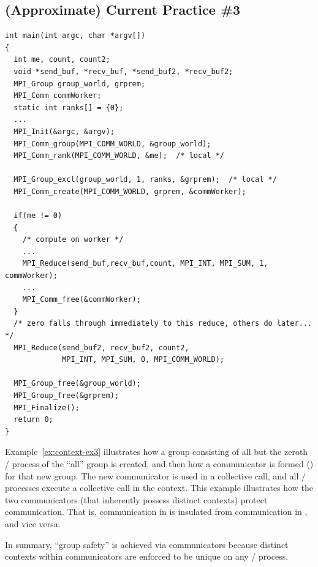 \subsection{(Approximate) Current Practice \#3}
\begin{example}
\label{ex:context-ex3}
%
\begin{lstlisting}[language={[MPI]C},basicstyle=\lstsmall]
int main(int argc, char *argv[])
{
  int me, count, count2;
  void *send_buf, *recv_buf, *send_buf2, *recv_buf2;
  MPI_Group group_world, grprem;
  MPI_Comm commWorker;
  static int ranks[] = {0};
  ...
  MPI_Init(&argc, &argv);
  MPI_Comm_group(MPI_COMM_WORLD, &group_world);
  MPI_Comm_rank(MPI_COMM_WORLD, &me);  /* local */

  MPI_Group_excl(group_world, 1, ranks, &grprem);  /* local */
  MPI_Comm_create(MPI_COMM_WORLD, grprem, &commWorker);

  if(me != 0)
  {
    /* compute on worker */
    ...
    MPI_Reduce(send_buf,recv_buf,count, MPI_INT, MPI_SUM, 1, commWorker);
    ...
    MPI_Comm_free(&commWorker);
  }
  /* zero falls through immediately to this reduce, others do later... */
  MPI_Reduce(send_buf2, recv_buf2, count2,
             MPI_INT, MPI_SUM, 0, MPI_COMM_WORLD);

  MPI_Group_free(&group_world);
  MPI_Group_free(&grprem);
  MPI_Finalize();
  return 0;
}
\end{lstlisting}
Example~\ref{ex:context-ex3} illustrates how a group consisting of all but the zeroth
\MPI/ process of the ``all'' group is created, and then how a communicator is formed 
() for that new group. The new communicator is used in
a collective call, and all \MPI/ processes execute a collective call
in the  context. This example illustrates
how the two communicators (that inherently possess distinct contexts) protect
communication. That is, communication in  is
insulated from communication in , and vice versa.

In summary, ``group safety'' is achieved via communicators because
distinct contexts within communicators are enforced to be unique on
any \MPI/ process.
\end{example}

